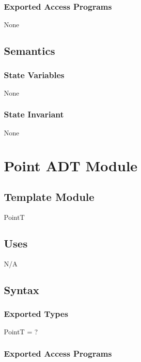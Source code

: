 \documentclass[12pt]{article}
\begin{document}
\subsubsection* {Exported Access Programs}

None

\subsection* {Semantics}

\subsubsection* {State Variables}

None

\subsubsection* {State Invariant}

None

\newpage

\section* {Point ADT Module}

\subsection*{Template Module}

PointT

\subsection* {Uses}

N/A

\subsection* {Syntax}

\subsubsection* {Exported Types}

PointT = ?

\subsubsection* {Exported Access Programs}
\end{document}
